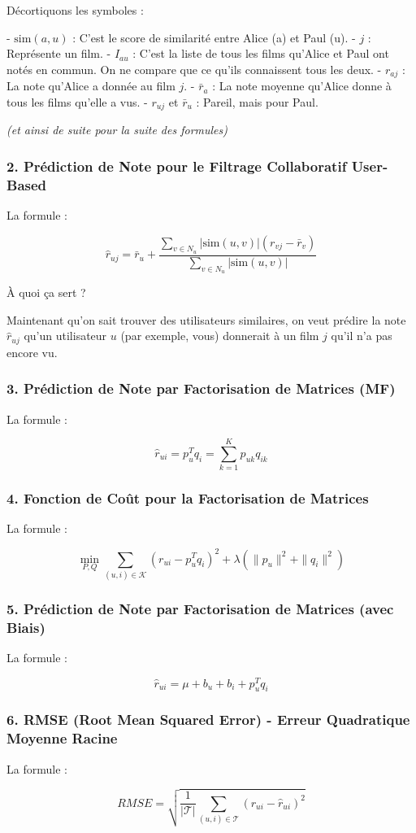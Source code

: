 \documentclass{article}
\begin{document}
Décortiquons les symboles :

- \( \text{sim}(a,u) \) : C'est le score de similarité entre Alice (a) et Paul (u).
- \( j \) : Représente un film.
- \( I_{au} \) : C'est la liste de tous les films qu'Alice et Paul ont notés en commun. On ne compare que ce qu'ils connaissent tous les deux.
- \( r_{aj} \) : La note qu'Alice a donnée au film \( j \).
- \( \bar{r}_a \) : La note moyenne qu'Alice donne à tous les films qu'elle a vus.
- \( r_{uj} \) et \( \bar{r}_u \) : Pareil, mais pour Paul.

\textit{(et ainsi de suite pour la suite des formules)}

\subsubsection{2. Prédiction de Note pour le Filtrage Collaboratif User-Based}

La formule :

\[
\hat{r}_{uj} = \bar{r}_u + \frac{\sum_{v \in N_u} \left|\text{sim}(u,v)\right| \left( r_{vj} - \bar{r}_v \right)}{\sum_{v \in N_u} \left|\text{sim}(u,v)\right|}
\]

À quoi ça sert ?

Maintenant qu'on sait trouver des utilisateurs similaires, on veut prédire la note \( \hat{r}_{uj} \) qu'un utilisateur \( u \) (par exemple, vous) donnerait à un film \( j \) qu'il n'a pas encore vu.

\subsubsection{3. Prédiction de Note par Factorisation de Matrices (MF)}

La formule :

\[
\hat{r}_{ui} = p_u^T q_i = \sum_{k=1}^K p_{uk} q_{ik}
\]

\subsubsection{4. Fonction de Coût pour la Factorisation de Matrices}

La formule :

\[
\min_{P,Q} \sum_{(u,i) \in \mathcal{K}} \left( r_{ui} - p_u^T q_i \right)^2 + \lambda \left( \|p_u\|^2 + \|q_i\|^2 \right)
\]

\subsubsection{5. Prédiction de Note par Factorisation de Matrices (avec Biais)}

La formule :

\[
\hat{r}_{ui} = \mu + b_u + b_i + p_u^T q_i
\]

\subsubsection{6. RMSE (Root Mean Squared Error) - Erreur Quadratique Moyenne Racine}

La formule :

\[
RMSE = \sqrt{\frac{1}{|\mathcal{T}|} \sum_{(u,i) \in \mathcal{T}} \left( r_{ui} - \hat{r}_{ui} \right)^2}
\]
\end{document}
